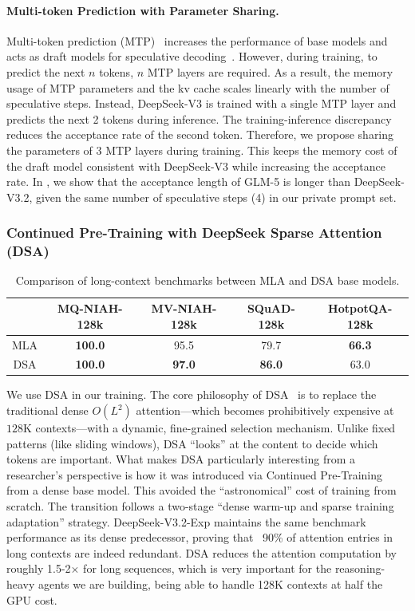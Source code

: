\documentclass{article}
\theoremstyle{definition}
\begin{document}
\paragraph{Multi-token Prediction with Parameter Sharing.} Multi-token prediction (MTP)~\cite{gloeckle2024mtp,liu2024deepseek} increases the performance of base models and acts as draft models for speculative decoding~\cite{leviathan2023spec}. However, during training, to predict the next $n$ tokens, $n$ MTP layers are required. As a result, the memory usage of MTP parameters and the kv cache scales linearly with the number of speculative steps. Instead, DeepSeek-V3 is trained with a single MTP layer and predicts the next 2 tokens during inference. The training-inference discrepancy reduces the acceptance rate of the second token. Therefore, we propose sharing the parameters of 3 MTP layers during training. This keeps the memory cost of the draft model consistent with DeepSeek-V3 while increasing the acceptance rate. In , we show that the acceptance length of GLM-5 is longer than DeepSeek-V3.2, given the same number of speculative steps (4) in our private prompt set.

\subsubsection{Continued Pre-Training with DeepSeek Sparse Attention (DSA)}
\begin{table}[!ht]
    \centering
    \caption{Comparison of long-context benchmarks between MLA and DSA base models.}
    \begin{tabular}{c|cccc}
    \toprule
     & MQ-NIAH-128k & MV-NIAH-128k & SQuAD-128k & HotpotQA-128k \\
    \midrule
    MLA & \textbf{100.0} & 95.5 & 79.7 & \textbf{66.3} \\
    DSA & \textbf{100.0} & \textbf{97.0} & \textbf{86.0} & 63.0\\
    \bottomrule
    \end{tabular}
    \label{tab:dsa}
\end{table}
We use DSA in our training. 
The core philosophy of DSA~\cite{deepseekai2025deepseekv32pushingfrontieropen} is to replace the traditional dense $O(L^2)$ attention—which becomes prohibitively expensive at $128\text{K}$ contexts—with a dynamic, fine-grained selection mechanism. Unlike fixed patterns (like sliding windows), DSA ``looks'' at the content to decide which tokens are important.
What makes DSA particularly interesting from a researcher's perspective is how it was introduced via Continued Pre-Training from a dense base model. This avoided the ``astronomical'' cost of training from scratch. The transition follows a two-stage ``dense warm-up and sparse training adaptation'' strategy. DeepSeek-V3.2-Exp maintains the same benchmark performance as its dense predecessor, proving that ~90\% of attention entries in long contexts are indeed redundant.
DSA reduces the attention computation by roughly 1.5-2× for long sequences, which is very important for the reasoning-heavy agents we are building, being able to handle 128K contexts at half the GPU cost.
\end{document}
